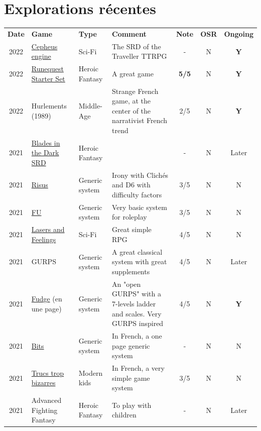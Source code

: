 \documentclass[a4paper, 11pt, twoside]{article}
\begin{document}
\section{Explorations récentes}
\label{sec:org2722ea0}

\begin{longtable}{cp{2cm}p{1.5cm}p{7cm}ccc}
\textbf{Date} & \textbf{Game} & \textbf{Type} & \textbf{Comment} & \textbf{Note} & \textbf{OSR} & \textbf{Ongoing}\\
2022 & \href{https://www.drivethrurpg.com/product/186894/Cepheus-Engine-System-Reference-Document}{Cepheus engine} & Sci-Fi & The SRD of the Traveller TTRPG & - & N & \textbf{Y}\\
2022 & \href{https://www.chaosium.com/runequest-starter-set/}{Runequest Starter Set} & Heroic Fantasy & A great game & \textbf{5/5} & N & \textbf{Y}\\
2022 & Hurlements (1989) & Middle-Age & Strange French game, at the center of the narrativist French trend & 2/5 & N & \textbf{Y}\\
2021 & \href{https://github.com/orey/jdr/tree/master/BladesInTheDark-SRD}{Blades in the Dark SRD} & Heroic Fantasy &  & - & N & Later\\
2021 & \href{https://github.com/orey/jdr/tree/master/Risus-fr}{Risus} & Generic system & Irony with Clichés and D6 with difficulty factors & 3/5 & N & N\\
2021 & \href{https://www.drivethrurpg.com/product/89534/FU-The-Freeform-Universal-RPG-Classic-rules}{FU} & Generic system & Very basic system for roleplay & 3/5 & N & N\\
2021 & \href{http://www.onesevendesign.com/laserfeelings/}{Lasers and Feelings} & Sci-Fi & Great simple RPG & 4/5 & N & N\\
2021 & GURPS & Generic system & A great classical system with great supplements & 4/5 & N & Later\\
2021 & \href{https://github.com/orey/jdr/blob/master/Fudge-fr/FudgeEnUnePage-ORey03.pdf}{Fudge} (en une page) & Generic system & An "open GURPS" with a 7-levels ladder and scales. Very GURPS inspired & 4/5 & N & \textbf{Y}\\
2021 & \href{http://komajdr.free.fr/fichiers/BiTs.rar}{Bits } & Generic system & In French, a one page generic system & - & N & N\\
2021 & \href{http://storygame.free.fr/}{Trucs trop bizarres} & Modern kids & In French, a very simple game system & 3/5 & N & N\\
2021 & Advanced Fighting Fantasy & Heroic Fantasy & To play with children & - & N & Later\\

\end{longtable}
\end{document}
